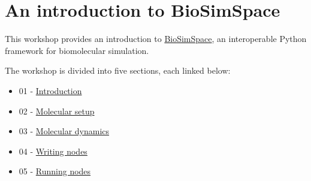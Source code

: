 \hypertarget{an-introduction-to-biosimspace}{%
\section{An introduction to
BioSimSpace}\label{an-introduction-to-biosimspace}}

This workshop provides an introduction to
\href{https://biosimspace.org/index.html}{BioSimSpace}, an interoperable
Python framework for biomolecular simulation.

The workshop is divided into five sections, each linked below:

\begin{itemize}
\tightlist
\item
  01 -
  \href{https://github.com/michellab/BioSimSpaceTutorials/blob/4fbbd25dc00acfbd7cfebfdc11ce69c3c77f9520/01_introduction/01_introduction.md}{Introduction}
\item
  02 -
  \href{https://github.com/michellab/BioSimSpaceTutorials/blob/4fbbd25dc00acfbd7cfebfdc11ce69c3c77f9520/01_introduction/02_molecular_setup.md}{Molecular
  setup}
\item
  03 -
  \href{https://github.com/michellab/BioSimSpaceTutorials/blob/4fbbd25dc00acfbd7cfebfdc11ce69c3c77f9520/01_introduction/03_molecular_dynamics.md}{Molecular
  dynamics}
\item
  04 -
  \href{https://github.com/michellab/BioSimSpaceTutorials/blob/4fbbd25dc00acfbd7cfebfdc11ce69c3c77f9520/01_introduction/04_writing_nodes.md}{Writing
  nodes}
\item
  05 -
  \href{https://github.com/michellab/BioSimSpaceTutorials/blob/4fbbd25dc00acfbd7cfebfdc11ce69c3c77f9520/01_introduction/05_running_nodes.md}{Running
  nodes}
\end{itemize}
